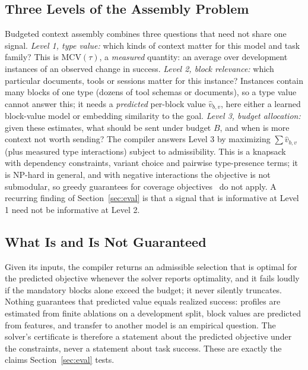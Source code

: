 \subsection{Three Levels of the Assembly Problem}
Budgeted context assembly combines three questions that need not share one signal.
\emph{Level 1, type value:} which kinds of context matter for this model and task family? This is
$\mathrm{MCV}(\tau)$, a \emph{measured} quantity: an average over development instances of an observed change in success.
\emph{Level 2, block relevance:} which particular documents, tools or sessions matter for this instance? Instances
contain many blocks of one type (dozens of tool schemas or documents), so a type value cannot answer this; it needs a
\emph{predicted} per-block value $\hat v_{b,v}$, here either a learned block-value model or embedding similarity to the
goal. \emph{Level 3, budget allocation:} given these estimates, what should be sent under budget $B$, and when is more
context not worth sending? The compiler answers Level 3 by maximizing $\sum \hat v_{b,v}$ (plus measured type
interactions) subject to admissibility. This is a knapsack with dependency constraints, variant choice and pairwise
type-presence terms; it is NP-hard in general, and with negative interactions the objective is not submodular, so greedy
guarantees for coverage objectives~\citep{pacms2026,skillselect2026} do not apply. A recurring finding of
Section~\ref{sec:eval} is that a signal that is informative at Level 1 need not be informative at Level 2.

\subsection{What Is and Is Not Guaranteed}
Given its inputs, the compiler returns an admissible selection that is optimal for the predicted objective whenever the
solver reports optimality, and it fails loudly if the mandatory blocks alone exceed the budget; it never silently
truncates. Nothing guarantees that predicted value equals realized success: profiles are estimated from finite ablations
on a development split, block values are predicted from features, and transfer to another model is an empirical
question. The solver's certificate is therefore a statement about the predicted objective under the constraints, never a
statement about task success. These are exactly the claims Section~\ref{sec:eval} tests.
